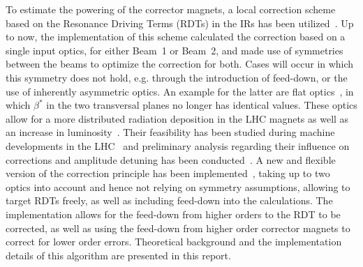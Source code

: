 
To estimate the powering of the corrector magnets, a local correction scheme
based on the Resonance Driving Terms (RDTs) in the IRs has been 
utilized~\cite{BruningDynamicApertureStudies2004}. 
Up to now, the implementation of this scheme calculated the correction based on a single input optics, 
for either Beam~1 or Beam~2, and made use of symmetries between the beams to optimize the correction for both. 
Cases will occur in which this symmetry does not hold, e.g. through the introduction of feed-down, or the use of inherently asymmetric optics.
An example for the latter are flat optics~\cite{FartoukhAchromaticTelescopicSqueezing2013,FartoukhFlatTelescopicOptics2018},
in which $\beta^*$ in the two transversal planes no longer has identical values. 
These optics allow for a more distributed radiation deposition in the LHC magnets as well as an increase 
in luminosity~\cite{FartoukhFlatTelescopicOptics2018}.
Their feasibility has been studied during machine developments in the LHC~\cite{FartoukhFirstHighIntensityBeam2019}
and preliminary analysis regarding their influence on corrections and amplitude detuning has been conducted~\cite{DillyCorrectionAmpDet2018}.
A new and flexible version of the correction principle has been implemented~\cite{OMC-TeamIRNLRDTCorrection}, 
taking up to two optics into account and hence not relying on symmetry assumptions, allowing to target RDTs freely,
as well as including feed-down into the calculations. 
The implementation allows for the feed-down from higher orders to the RDT to be corrected, 
as well as using the feed-down from higher order corrector magnets to correct for lower order errors.
Theoretical background and the implementation details of this algorithm are presented in this report.

